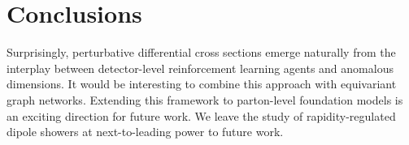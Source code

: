 \section{Conclusions}\label{sec:conclusions}

Surprisingly, perturbative differential cross sections emerge naturally
from the interplay between detector-level reinforcement learning agents
and anomalous dimensions. It would be interesting to combine this
approach with equivariant graph networks. Extending this framework to
parton-level foundation models is an exciting direction for future work.
We leave the study of rapidity-regulated dipole showers at
next-to-leading power to future work.

